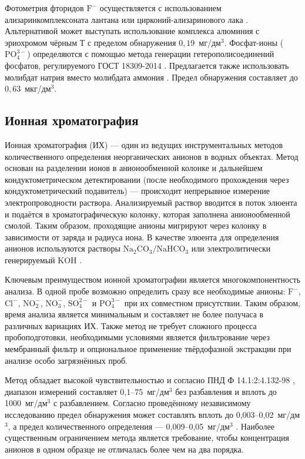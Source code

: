 Фотометрия фторидов $\text{F}^-$ осуществляется с использованием ализаринкомплексоната лантана или цирконий-ализаринового лака \cite{gost438689}. Альтернативой может выступать использование комплекса алюминия с эриохромом чёрным Т \cite{mariamSpectroscopicDeterminationFluoride2021} с пределом обнаружения $0{,}19$~мг/дм$^3$. Фосфат-ионы ($\text{PO}_4^{3-}$) определяются с помощью метода генерации гетерополисоединений фосфатов, регулируемого ГОСТ 18309-2014 \cite{gost183092014}. Предлагается также использовать молибдат натрия вместо молибдата аммония \cite{linSpectrophotometricDeterminationPhosphate2025}. Предел обнаружения составляет до $0{,}63$~мкг/дм$^3$.

\subsection{Ионная хроматография}

Ионная хроматография (ИХ) — один из ведущих инструментальных методов количественного определения неорганических анионов в водных объектах. Метод основан на разделении ионов в анионообменной колонке и дальнейшем кондуктометрическом детектировании (после необходимого прохождения через кондуктометрический подавитель) — происходит непрерывное измерение электропроводности раствора. Анализируемый раствор вводится в поток элюента и подаётся в хроматографическую колонку, которая заполнена анионообменной смолой. Таким образом, проходящие анионы мигрируют через колонку в зависимости от заряда и радиуса иона. В качестве элюента для определения анионов используются растворы $\text{Na}_2\text{CO}_3/\text{NaHCO}_3$ или электролитически генерируемый $\text{KOH}$ \cite{liApplicationsTwodimensionalIon2023}.

Ключевым преимуществом ионной хроматографии является многокомпонентность анализа. В одной пробе возможно определить сразу все необходимые анионы: $\text{F}^-$, $\text{Cl}^-$, $\text{NO}_2^-$, $\text{NO}_3^-$, $\text{SO}_4^{2-}$ и $\text{PO}_4^{3-}$ при их совместном присутствии. Таким образом, время анализа является минимальным и составляет не более получаса в различных вариациях ИХ. Также метод не требует сложного процесса пробоподготовки, необходимыми условиями является фильтрование через мембранный фильтр и опциональное применение твёрдофазной экстракции при анализе особо загрязнённых проб.

Метод обладает высокой чувствительностью и согласно ПНД Ф 14.1:2:4.132-98 \cite{pndf141244132}, диапазон измерений составляет 0,1--75~мг/дм$^3$ без разбавления и вплоть до 1000~мг/дм$^3$ с разбавлением. Согласно проведённому независимому исследованию предел обнаружения может составлять вплоть до 0,003--0,02~мг/дм$^3$, а предел количественного определения — 0,009--0,05~мг/дм$^3$ \cite{filiposkaSpasicValidationIon2025}. Наиболее существенным ограничением метода является требование, чтобы концентрация анионов в одном образце не отличалась более чем на два порядка.


